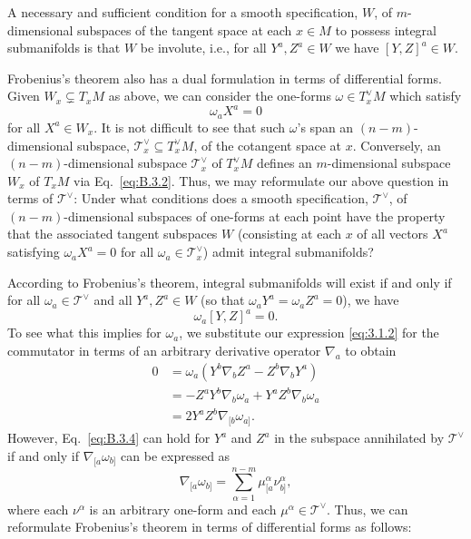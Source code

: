 \renewcommand{\thetheorem}{B.3.\arabic{theorem}}
\setcounter{theorem}{0}
\begin{theorem}\label{thm:B.3.1}
A necessary and sufficient condition for a smooth specification, \(W\), of
\(m\)-dimensional subspaces of the tangent space at each \(x\in M\) to possess
integral submanifolds is that \(W\) be involute, i.e., for all
\(Y^a,Z^a\in W\) we have \([Y,Z]^a\in W\).
\end{theorem}

Frobenius's theorem also has a dual formulation in terms of differential forms.
Given \(W_x\subsetneq T_xM\) as above, we can consider the one-forms
\(\omega\in T_x^\vee M\) which satisfy
\begin{equation}
  \omega_aX^a=0
  \tag{B.3.2}\label{eq:B.3.2}
\end{equation}
for all \(X^a\in W_x\). It is not difficult to see that such \(\omega\)'s span an
\((n-m)\)-dimensional subspace,
\(\mathcal T_x^\vee\subseteq T_x^\vee M\), of the cotangent space at \(x\). Conversely, an
\((n-m)\)-dimensional subspace \(\mathcal T_x^\vee\) of \(T_x^\vee M\) defines an
\(m\)-dimensional subspace \(W_x\) of \(T_xM\) via Eq.~\eqref{eq:B.3.2}. Thus, we may
reformulate our above question in terms of \(\mathcal T^\vee\): Under what conditions
does a smooth specification, \(\mathcal T^\vee\), of \((n-m)\)-dimensional subspaces
of one-forms at each point have the property that the associated tangent subspaces
\(W\) (consisting at each \(x\) of all vectors \(X^a\) satisfying
\(\omega_aX^a=0\) for all \(\omega_a\in\mathcal T_x^\vee\)) admit integral
submanifolds?

According to Frobenius's theorem, integral submanifolds will exist if and only if for
all \(\omega_a\in\mathcal T^\vee\) and all \(Y^a,Z^a\in W\) (so that
\(\omega_aY^a=\omega_aZ^a=0\)), we have
\begin{equation}
  \omega_a[Y,Z]^a=0.
  \tag{B.3.3}\label{eq:B.3.3}
\end{equation}
To see what this implies for \(\omega_a\), we substitute our expression
\eqref{eq:3.1.2} for the commutator in terms of an arbitrary derivative operator
\(\nabla_a\) to obtain
\begin{equation}
  \begin{aligned}
  0
  & =\omega_a(Y^b\nabla_bZ^a-Z^b\nabla_bY^a)\\
  & =-Z^aY^b\nabla_b\omega_a+Y^aZ^b\nabla_b\omega_a\\
  & =2Y^aZ^b\nabla_{[b}\omega_{a]}.
  \end{aligned}
  \tag{B.3.4}\label{eq:B.3.4}
\end{equation}
However, Eq.~\eqref{eq:B.3.4} can hold for \(Y^a\) and \(Z^a\) in the subspace
annihilated by \(\mathcal T^\vee\) if and only if
\(\nabla_{[a}\omega_{b]}\) can be expressed as
\begin{equation}
  \nabla_{[a}\omega_{b]}
  =\sum_{\alpha=1}^{n-m}\mu^\alpha_{[a}\nu^\alpha_{b]},
  \tag{B.3.5}\label{eq:B.3.5}
\end{equation}
where each \(\nu^\alpha\) is an arbitrary one-form and each
\(\mu^\alpha\in\mathcal T^\vee\). Thus, we can reformulate Frobenius's theorem in terms
of differential forms as follows:

